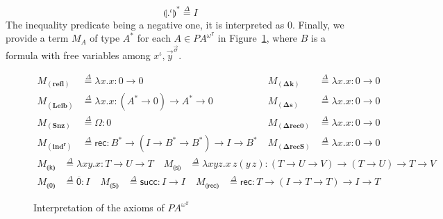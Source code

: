 \documentclass{CSML}
\newcommand*\Def{\mathrel{\overset{\Delta}{=}}}
\newcommand*\SortBase\iota
\newcommand*\SortA{\sigma}
\newcommand*\LogSortedTerm[2]{#1^{#2}}
\newcommand*\LogVarA{x}
\newcommand*\LogVarB{y}
\newcommand*\LogConst[1]{\mathsf{#1}}
\newcommand*\LogRel[1]{\llparenthesis#1\rrparenthesis}
\newcommand*\LogRelForm[1]{{#1^\mathrm{r}}}
\newcommand*\LogFormA{A}
\newcommand*\LogFormB{B}
\newcommand*\LmSortBot0
\newcommand*\LmSortTo\to
\newcommand*\LmSortA{T}
\newcommand*\LmSortB{U}
\newcommand*\LmSortC{V}
\newcommand*\LmTerm[2]{#1\mathrel{:}#2}
\newcommand*\LmVarA{x}
\newcommand*\LmVarB{y}
\newcommand*\LmVarC{z}
\newcommand*\LmConst[1]{\mathsf{#1}}
\newcommand*\LmInterpForm[1]{{#1}^*}
\newcommand*\LmInterpAxiom[1]{M_{#1}}
\newcommand*\PA{{P\!A}}
\newcommand*\PAom{{\PA^\omega}}
\newcommand*\CASort\iota
\newcommand*\CALogs{\LogConst{s}}
\newcommand*\CALogk{\LogConst{k}}
\newcommand*\CALogZ{\LogConst{0}}
\newcommand*\CALogS{\LogConst{S}}
\newcommand*\CALogrec{\LogConst{rec}}
\newcommand*\CAAxName[1]{{\bm{\scriptstyle(#1)}}}
\newcommand*\CAReflName{\CAAxName{refl}}
\newcommand*\CAReflSort{\LmSortBot\LmSortTo\LmSortBot}
\newcommand*\CALeibName{\CAAxName{Leib}}
\newcommand*\CALeibSort[1]{\left(\LmInterpForm{#1}\LmSortTo\LmSortBot\right)\LmSortTo\LmInterpForm{#1}\LmSortTo\LmSortBot}
\newcommand*\CAdefsName{\CAAxName{\Delta s}}
\newcommand*\CAdefsTerm{\lambda\LmVarA.\LmVarA}
\newcommand*\CAdefsSort{\LmSortBot\LmSortTo\LmSortBot}
\newcommand*\CAdefkName{\CAAxName{\Delta k}}
\newcommand*\CAdefkTerm{\lambda\LmVarA.\LmVarA}
\newcommand*\CAdefkSort{\LmSortBot\LmSortTo\LmSortBot}
\newcommand*\CAdefrecZName{\CAAxName{\Delta rec0}}
\newcommand*\CAdefrecZTerm{\lambda\LmVarA.\LmVarA}
\newcommand*\CAdefrecZSort{\LmSortBot\LmSortTo\LmSortBot}
\newcommand*\CAdefrecSName{\CAAxName{\Delta recS}}
\newcommand*\CAdefrecSTerm{\lambda\LmVarA.\LmVarA}
\newcommand*\CAdefrecSSort{\LmSortBot\LmSortTo\LmSortBot}
\newcommand*\CASnZName{\CAAxName{Snz}}
\newcommand*\CASnZTerm{\CALmom}
\newcommand*\CASnZSort{\LmSortBot}
\newcommand*\CAindName{\CAAxName{ind^r}}
\newcommand*\CAindTerm\CALmrec
\newcommand*\CAindSort[1]{\LmInterpForm{#1}\LmSortTo\left(\CALmnSort\LmSortTo\LmInterpForm{#1}\LmSortTo\LmInterpForm{#1}\right)\LmSortTo\CALmnSort\LmSortTo\LmInterpForm{#1}}
\newcommand*\CARelsNoType{\LogRel{\CALogs}}
\newcommand*\CARelsTerm{\lambda\LmVarA\LmVarB\LmVarC.\LmVarA\,\LmVarC\left(\LmVarB\,\LmVarC\right)}
\newcommand*\CARelsSort[3]{\left(#1\LmSortTo#2\LmSortTo#3\right)\LmSortTo\left(#1\LmSortTo#2\right)\LmSortTo#1\LmSortTo#3}
\newcommand*\CARelkNoType{\LogRel{\CALogk}}
\newcommand*\CARelkTerm{\lambda\LmVarA\LmVarB.\LmVarA}
\newcommand*\CARelkSort[2]{#1\LmSortTo#2\LmSortTo#1}
\newcommand*\CARelZNoType{\LogRel{\CALogZ}}
\newcommand*\CARelZTerm{\CALmn{0}}
\newcommand*\CARelZSort{\CALmnSort}
\newcommand*\CARelSNoType{\LogRel{\CALogS}}
\newcommand*\CARelSTerm{\CALmsucc}
\newcommand*\CARelSSort{\CALmnSort\LmSortTo\CALmnSort}
\newcommand*\CARelrecNoType{\LogRel{\CALogrec}}
\newcommand*\CARelrecTerm{\CALmrec}
\newcommand*\CARelrecSort[1]{#1\LmSortTo\left(\CALmnSort\LmSortTo#1\LmSortTo#1\right)\LmSortTo\CALmnSort\LmSortTo#1}
\newcommand*\CALmn[1]{\LmConst{\overline{#1}}}
\newcommand*\CALmnSort{I}
\newcommand*\CALmom{\LmConst{\Omega}}
\newcommand*\CALmsucc{\LmConst{succ}}
\newcommand*\CALmrec{\LmConst{rec}}
\begin{document}
$$\LmInterpForm{\LogRel{\LogSortedTerm{.}{\SortBase}}}\Def\CALmnSort$$
The inequality predicate being a negative one, it is interpreted as $\LmSortBot$. Finally, we provide a term $\LmInterpAxiom{\LogFormA}$ of type $\LmInterpForm{\LogFormA}$ for each $\LogFormA\in\LogRelForm{\PAom}$ in Figure~\ref{AxiomTrans}, where $\LogFormB$ is a formula with free variables among $\LogSortedTerm{\LogVarA}{\CASort},\LogSortedTerm{\vec{\LogVarB}}{\vec{\SortA}}$.
\begin{figure}
\begin{align*}
\LmInterpAxiom{\CAReflName}&\Def\LmTerm{\lambda\LmVarA.\LmVarA}{\CAReflSort}&\;\LmInterpAxiom{\CAdefkName}&\Def\LmTerm{\CAdefkTerm}{\CAdefkSort}\\
\LmInterpAxiom{\CALeibName}&\Def\LmTerm{\lambda\LmVarA.\LmVarA}{\CALeibSort{\LogFormA}}&\;\LmInterpAxiom{\CAdefsName}&\Def\LmTerm{\CAdefsTerm}{\CAdefsSort}\\
\LmInterpAxiom{\CASnZName}&\Def\LmTerm{\CASnZTerm}{\CASnZSort}&\;\LmInterpAxiom{\CAdefrecZName}&\Def\LmTerm{\CAdefrecZTerm}{\CAdefrecZSort}\\
\LmInterpAxiom{\CAindName}&\Def\LmTerm{\CAindTerm}{\CAindSort{\LogFormB}}&\;\LmInterpAxiom{\CAdefrecSName}&\Def\LmTerm{\CAdefrecSTerm}{\CAdefrecSSort}
\end{align*}
\begin{align*}
\LmInterpAxiom{\CARelkNoType}&\Def\LmTerm{\CARelkTerm}{\CARelkSort{\LmSortA}{\LmSortB}}&\;\LmInterpAxiom{\CARelsNoType}&\Def\LmTerm{\CARelsTerm}{\CARelsSort{\LmSortA}{\LmSortB}{\LmSortC}}
\end{align*}
\begin{align*}
\LmInterpAxiom{\CARelZNoType}&\Def\LmTerm{\CARelZTerm}{\CARelZSort}&\;\LmInterpAxiom{\CARelSNoType}&\Def\LmTerm{\CARelSTerm}{\CARelSSort}&\;\LmInterpAxiom{\CARelrecNoType}&\Def\LmTerm{\CARelrecTerm}{\CARelrecSort{\LmSortA}}
\end{align*}
\caption{Interpretation of the axioms of $\LogRelForm{\PAom}$}
\label{AxiomTrans}
\end{figure}
\end{document}

